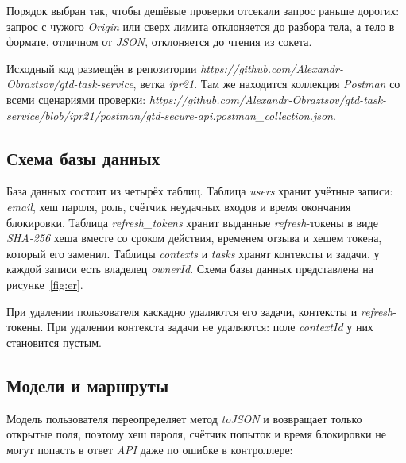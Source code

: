 \documentclass{stp}
\begin{document}
Порядок выбран так, чтобы дешёвые проверки отсекали запрос раньше
дорогих: запрос с чужого \textit{Origin} или сверх лимита отклоняется до разбора
тела, а тело в формате, отличном от \textit{JSON}, отклоняется до чтения из
сокета.

Исходный код размещён в репозитории
\textit{https://github.com/\allowbreak{}Alexandr-Obraztsov/\allowbreak{}gtd-task-service}, ветка \textit{ipr21}.
Там же находится коллекция \textit{Postman} со всеми сценариями проверки:
\textit{https://github.com/\allowbreak{}Alexandr-Obraztsov/\allowbreak{}gtd-task-service/\allowbreak{}blob/\allowbreak{}ipr21/\allowbreak{}postman/\allowbreak{}gtd-secure-api.postman\_collection.json}.

\subsection{Схема базы данных}

База данных состоит из четырёх таблиц. Таблица \textit{users} хранит учётные
записи: \textit{email}, хеш пароля, роль, счётчик неудачных входов и время
окончания блокировки. Таблица \textit{refresh\_tokens} хранит выданные
\textit{refresh}-токены в виде \textit{SHA-256} хеша вместе со сроком действия, временем
отзыва и хешем токена, который его заменил. Таблицы \textit{contexts} и \textit{tasks}
хранят контексты и задачи, у каждой записи есть владелец \textit{ownerId}.
Схема базы данных представлена на рисунке~\ref{fig:er}.


При удалении пользователя каскадно удаляются его задачи, контексты и
\textit{refresh}-токены. При удалении контекста задачи не удаляются: поле
\textit{contextId} у них становится пустым.

\subsection{Модели и маршруты}

Модель пользователя переопределяет метод \textit{toJSON} и возвращает только
открытые поля, поэтому хеш пароля, счётчик попыток и время блокировки
не могут попасть в ответ \textit{API} даже по ошибке в контроллере:
\end{document}
